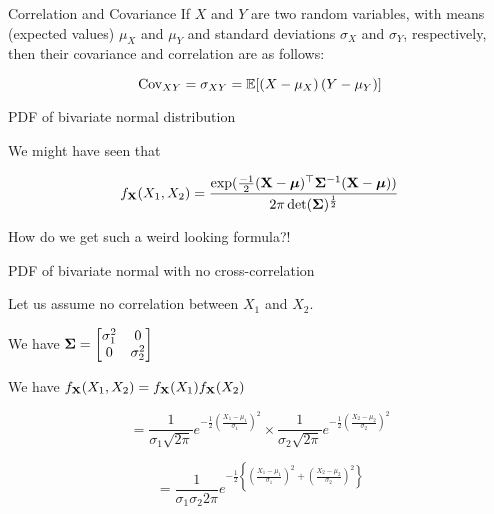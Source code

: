 \documentclass{beamer}
\begin{document}
\begin{frame}{Correlation and Covariance}
If $X$ and $Y$ are two random variables, with means (expected values) $\mu_X$ and $\mu_Y$ and standard deviations $\sigma_X$ and $\sigma_Y$, respectively, then their covariance and correlation are as follows:

$$\operatorname{Cov}_{XY} = \sigma_{XY} = \mathbb{E}[(X-\mu_X)\,(Y-\mu_Y)] $$

\end{frame}

\begin{frame}{PDF of bivariate normal distribution}

We might have seen that 

$$f_{\mathbf{X}}(X_1, X_2) = \frac{\exp(\frac{-1}{2}(\mathbf{X}-\boldsymbol{\mu})^\top \boldsymbol{\Sigma}^{-1}(\mathbf{X}-\boldsymbol{\mu}))}{2\pi \operatorname{det}(\boldsymbol{\Sigma})^\frac{1}{2}}$$

How do we get such a weird looking formula?!

\end{frame}

\begin{frame}{PDF of bivariate normal with no cross-correlation}

Let us assume no correlation between $X_1$ and $X_2$.

We have $\boldsymbol{\Sigma} = \begin{bmatrix}
\sigma_1^2 & 0 \\
0 & \sigma_2^2 \\
\end{bmatrix}$

We have $f_{\mathbf{X}}(X_1, X_2) = f_{\mathbf{X}}(X_1)f_{\mathbf{X}}(X_2)$

$$=\frac{1}{\sigma_1 \sqrt{2\pi} } e^{-\frac{1}{2}\left(\frac{X_1-\mu_1}{\sigma_1}\right)^2} \times \frac{1}{\sigma_2 \sqrt{2\pi} } e^{-\frac{1}{2}\left(\frac{X_2-\mu_2}{\sigma_2}\right)^2}$$

$$= \frac{1}{\sigma_1 \sigma_2 2\pi } e^{-\frac{1}{2}\left\{\left(\frac{X_1-\mu_1}{\sigma_1}\right)^2 + \left(\frac{X_2-\mu_2}{\sigma_2}\right)^2 \right\}}  $$
\end{frame}
\end{document}

